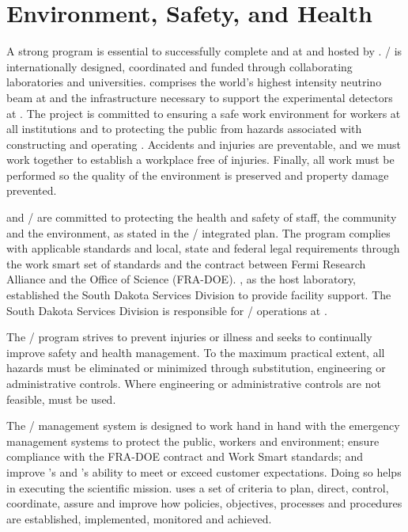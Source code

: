 \chapter{Environment, Safety, and Health}
\label{vl:tc-ESH}


A strong  program is essential to successfully complete
 and  at  and hosted by
\fnal.  / is internationally designed,
coordinated and funded through collaborating laboratories and
universities.   comprises the
world's highest intensity neutrino beam at \fnal and the
infrastructure necessary to support the experimental detectors at
. The  project is committed to ensuring a
safe work environment for  workers at all
institutions and to protecting the public from hazards associated with
constructing and operating .  Accidents and
injuries are preventable, and we must work together to
establish a workplace free of injuries.  Finally, all work must be
performed so the quality of the environment is preserved
and property damage prevented.

\fnal and / are committed to protecting the health and
safety of staff, the community and the environment, as stated in the
/ integrated  plan.  The
 program complies with applicable standards and local,
state and federal legal requirements through the \fnal work smart set
of standards and the contract between Fermi Research Alliance and the
 Office of Science (FRA-DOE). \fnal, as the host
laboratory, established the South Dakota Services Division to provide
facility support.  The South Dakota Services Division is responsible
for / operations at .

The /  program strives to prevent
injuries or illness and seeks to continually improve safety and health
management.  To the maximum practical extent, all hazards must be
eliminated or minimized through substitution, engineering or
administrative controls.  Where engineering or administrative controls
are not feasible,  must be used.

The /  management system is
designed to work hand in hand with the  emergency
management systems to protect the public, workers and environment;
ensure compliance with the FRA-DOE contract and \fnal Work Smart
standards; and improve \fnal's and 's ability to meet or
exceed customer expectations. Doing so helps in executing the
scientific mission.  \fnal uses a set of criteria to plan, direct,
control, coordinate, assure and improve how  policies,
objectives, processes and procedures are established, implemented,
monitored and achieved.

